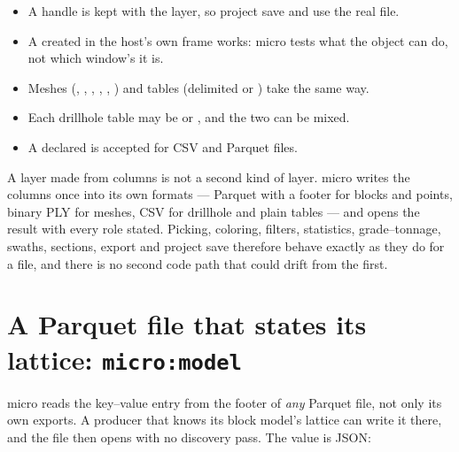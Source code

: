 \begin{itemize}
\item A handle is kept with the layer, so project save and  use the real file.
\item A  created in the host's own frame works: micro tests what the object can do, not
  which window's  it is.
\item Meshes (, , , , , ) and
  tables (delimited or ) take  the same way.
\item Each drillhole table may be  or , and the
  two can be mixed.
\item A declared  is accepted for CSV and Parquet files.
\end{itemize}

\begin{why}
A layer made from columns is not a second kind of layer. micro writes the columns once into its
own formats — Parquet with a  footer for blocks and points, binary PLY for
meshes, CSV for drillhole and plain tables — and opens the result with every role stated. Picking,
coloring, filters, statistics, grade–tonnage, swaths, sections, export and project save therefore
behave exactly as they do for a file, and there is no second code path that could drift from the
first.
\end{why}

\section{A Parquet file that states its lattice: \texttt{micro:model}}\label{sec:host-model}

micro reads the  key–value entry from the footer of \emph{any} Parquet file, not
only its own exports. A producer that knows its block model's lattice can write it there, and the
file then opens with no discovery pass. The value is JSON:

